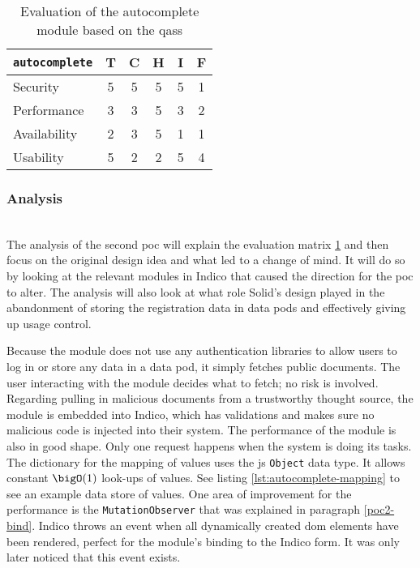 \begin{table}[h!]
    \centering
    \begin{tabular}{| l | c | c | c | c | c |} 
     \hline
     \texttt{autocomplete} & T & C & H & I & F \\
     \hline
     Security & 5 & 5 & 5 & 5 & \cellcolor{green!25}1\\
     \hline
     Performance & 3 & 3 & 5 & 3 & \cellcolor{green!25}2\\
     \hline
     Availability & 2 & 3 & 5 & 1 & \cellcolor{green!25}1\\
     \hline
     Usability & 5 & 2 & 2 & 5 & \cellcolor{red!25}4\\
     \hline
    \end{tabular}
    \vspace{0.75cm}
    \caption{Evaluation of the autocomplete module based on the \glspl{qas}}
    \label{table:poc2-evaluation}
\end{table}
\subsubsection{Analysis}\label{poc2:analysis}\mbox{}\\

The analysis of the second \gls{poc} will explain the evaluation matrix \ref{table:poc2-evaluation} and then focus on the original design idea and what led to a change of mind. It will do so by looking at the relevant modules in Indico that caused the direction for the \gls{poc} to alter.  The analysis will also look at what role Solid's design played in the abandonment of storing the registration data in data pods and effectively giving up usage control.

\vspace{0.5cm}

Because the module does not use any authentication libraries to allow users to log in or store any data in a data pod, it simply fetches public documents. The user interacting with the module decides what to fetch; no risk is involved. Regarding pulling in malicious documents from a trustworthy thought source, the module is embedded into Indico, which has validations and makes sure no malicious code is injected into their system.
The performance of the module is also in good shape. Only one request happens when the system is doing its tasks. The dictionary for the mapping of values uses the \gls{js} \texttt{Object} data type. It allows constant $\bigO(1)$ look-ups of values. See listing \ref{lst:autocomplete-mapping} to see an example data store of values. One area of improvement for the performance is the \texttt{MutationObserver} that was explained in paragraph \ref{poc2-bind}. Indico throws an event when all dynamically created \gls{dom} elements have been rendered, perfect for the module's binding to the Indico form. It was only later noticed that this event exists.
\vspace{0.5cm}
